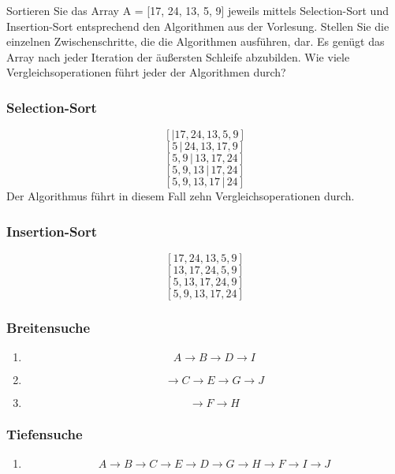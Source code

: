 \documentclass[a4paper, 12pt, margins=3cm]{homework}
\begin{document}
  \begin{problem}
    Sortieren Sie das Array A = [17, 24, 13, 5, 9] jeweils mittels Selection-Sort
    und Insertion-Sort entsprechend den Algorithmen aus der Vorlesung. Stellen Sie 
    die einzelnen Zwischenschritte, die die Algorithmen ausführen, dar. Es genügt das Array nach
    jeder Iteration der äußersten Schleife abzubilden. Wie viele Vergleichsoperationen führt
    jeder der Algorithmen durch?
  \end{problem}
  \begin{solution}\hfill
    \subsubsection*{Selection-Sort}
      \[ [|17, 24, 13, 5, 9] \]
      \[ [5\,|\, 24, 13, 17, 9] \]
      \[ [5, 9\,|\, 13, 17, 24] \]
      \[ [5, 9, 13\,|\, 17, 24] \]
      \[ [5, 9, 13, 17\,|\, 24] \]
      Der Algorithmus führt in diesem Fall zehn Vergleichsoperationen durch.

    \subsubsection*{Insertion-Sort}
      \[ [17, 24, 13, 5, 9] \]
      \[ [13, 17, 24, 5, 9] \]
      \[ [5, 13, 17, 24, 9] \]
      \[ [5, 9, 13, 17, 24] \]


  \end{solution}

\newpage

  \begin{problem}
    
  \end{problem}
  \begin{solution}\hfill

    \subsubsection*{Breitensuche}
      \begin{enumerate}
        \item \[ A\rightarrow B\rightarrow D\rightarrow I \]
        \item \[ \rightarrow C\rightarrow E\rightarrow G\rightarrow J \]
        \item \[ \rightarrow F\rightarrow H \]
      \end{enumerate}

    \subsubsection*{Tiefensuche}
      \begin{enumerate}
        \item \[ A\rightarrow B\rightarrow C\rightarrow E\rightarrow D\rightarrow G\rightarrow H\rightarrow
                 F\rightarrow I\rightarrow J \]
      \end{enumerate}

  \end{solution}
\end{document}
